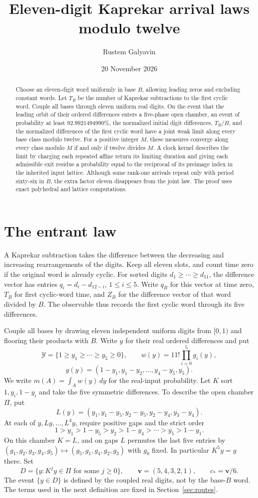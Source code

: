 \documentclass[11pt,reqno]{amsart}
\title[Eleven-digit Kaprekar arrival laws]{Eleven-digit Kaprekar arrival laws modulo twelve}
\author{Rustem Galyavin}
\date{20 November 2026}
\theoremstyle{definition}
\newcommand{\calY}{\mathcal Y}
\newcommand{\vct}{\mathbf v}
\newcommand{\cen}{c_*}
\newcommand{\T}{T_B}
\newcommand{\ZB}{Z_B}
\begin{document}
\raggedbottom
\begin{abstract}
Choose an eleven-digit word uniformly in base \(B\), allowing leading zeros and
excluding constant words. Let \(T_B\) be the number of Kaprekar subtractions
to the first cyclic word. Couple all bases through eleven uniform real digits.
On the event that the leading orbit of their ordered differences enters a
five-phase open chamber, an event of probability at least
\(92.9921494990\%\), the normalized initial digit differences, \(T_B/B\), and
the normalized differences of the first cyclic word have a joint weak limit
along every base class modulo twelve. For a positive integer \(M\), these
measures converge along every class modulo \(M\) if and only if twelve
divides \(M\). A clock kernel describes the limit by charging each repeated
affine return its limiting duration and giving each admissible exit residue
a probability equal to the reciprocal of its preimage index in the inherited
input lattice. Although some rank-one arrivals repeat only with period
sixty-six in \(B\), the extra factor eleven disappears from the joint law.
The proof uses exact polyhedral and lattice computations.
\end{abstract}
\maketitle

\section{The entrant law}

A Kaprekar subtraction takes the difference between the decreasing and
increasing rearrangements of the digits. Keep all eleven slots, and count time
zero if the original word is already cyclic. For sorted digits
\(d_1\ge\cdots\ge d_{11}\), the difference vector has entries
\(q_i=d_i-d_{12-i}\), \(1\le i\le5\). Write \(q_B\) for this vector at time
zero, \(\T\) for first cyclic-word time, and \(\ZB\) for the difference vector
of that word divided by \(B\). The observable thus records the first cyclic
word through its five differences.

Couple all bases by drawing eleven independent uniform digits from \([0,1)\)
and flooring their products with \(B\). Write \(y\) for their real ordered
differences and put
\[
 \calY=\{1\ge y_1\ge\cdots\ge y_5\ge0\},\qquad
 w(y)=11!\prod_{i=0}^5g_i(y),
\]
\[
 g(y)=(1-y_1,y_1-y_2,\ldots,y_4-y_5,y_5).
\]
We write \(m(A)=\int_A w(y)\,dy\) for the real-input probability. Let \(K\)
sort \(1,y_i,1-y_i\) and take the five symmetric differences. To describe the
open chamber \(\Pi\), put
\[
 L(y)=(y_1,y_1-y_5,y_2-y_5,y_2-y_4,y_3-y_4).
\]
At each of \(y,Ly,\ldots,L^4y\), require positive gaps and the strict order
\[
 1>y_1>1-y_5>y_2>1-y_4>\cdots>y_5>1-y_1 .
\]
On this chamber \(K=L\), and on gaps \(L\) permutes the last five entries by
\((g_1,g_2,g_3,g_4,g_5)\mapsto(g_5,g_1,g_4,g_2,g_3)\) with \(g_0\) fixed.
In particular \(K^5y=y\) there. Set
\[
 D=\{y:K^j y\in\Pi\text{ for some }j\ge0\},\qquad
 \vct=(5,4,3,2,1),\qquad \cen=\vct/6.
\]
The event \(\{y\in D\}\) is defined by the coupled real digits, not by the
base-\(B\) word. The terms used in the next definition are fixed in
Section~\ref{sec:routes}.
\end{document}
